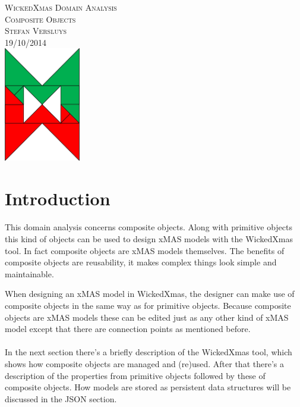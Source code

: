 \documentclass[a4paper,11pt,final]{article}
\begin{document}
\begin{titlepage}
	\vspace*{\fill}
	\begin{center}
		\textsc{\large WickedXmas Domain Analysis}\\[0.5cm]
		\textsc{\huge Composite Objects}\\[0.5cm]
		\textsc{Stefan Versluys}\\ \textsc{\scriptsize 19/10/2014}\\[2.0cm]
		\includegraphics[width=0.25\textwidth]{wXm}
	\end{center}
	\vspace*{\fill}
\end{titlepage}


\tableofcontents

\newpage

\section{Introduction}
\paragraph{}
This domain analysis concerns composite objects.
Along with primitive objects this kind of objects can be used to design xMAS
models with the WickedXmas tool. In fact composite objects are xMAS models
themselves.
The benefits of composite objects are reusability, it makes complex
things look simple and maintainable.

When designing an xMAS model in WickedXmas, the designer can make use of
composite objects in the same way as for primitive objects. Because
composite objects are xMAS models these can be edited just as any other kind
of xMAS model except that there are connection points as mentioned before.

\paragraph{}
In the next section there's a briefly description of the WickedXmas tool,
which shows how composite objects are managed and (re)used.
After that there's a description of the properties from primitive objects
followed by these of composite objects.
How models are stored as persistent data structures will be discussed in
the JSON section.
\end{document}
